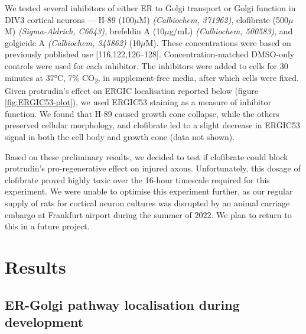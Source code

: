 \documentclass[
  12pt,
  a4paper,
]{book}
\begin{document}
We tested several inhibitors of either ER to Golgi transport or Golgi function in DIV3 cortical neurons --- H-89 (100\(\mu\)M) \emph{(Calbiochem, 371962)}, clofibrate (500\(\mu\)M) \emph{(Sigma-Aldrich, C6643)}, brefeldin A (10\(\mu\)g/mL) \emph{(Calbiochem, 500583)}, and golgicide A \emph{(Calbiochem, 345862)} (10\(\mu\)M). These concentrations were based on previously published use {[}116,122,126--128{]}. Concentration-matched DMSO-only controls were used for each inhibitor. The inhibitors were added to cells for 30 minutes at 37°C, 7\% CO\textsubscript{2}, in supplement-free media, after which cells were fixed. Given protrudin's effect on ERGIC localisation reported below (figure \ref{fig:ERGIC53-plot}), we used ERGIC53 staining as a measure of inhibitor function. We found that H-89 caused growth cone collapse, while the others preserved cellular morphology, and clofibrate led to a slight decrease in ERGIC53 signal in both the cell body and growth cone (data not shown).

Based on these preliminary results, we decided to test if clofibrate could block protrudin's pro-regenerative effect on injured axons. Unfortunately, this dosage of clofibrate proved highly toxic over the 16-hour timescale required for this experiment. We were unable to optimise this experiment further, as our regular supply of rats for cortical neuron cultures was disrupted by an animal carriage embargo at Frankfurt airport during the summer of 2022. We plan to return to this in a future project.

\hypertarget{results-2}{%
\section{Results}\label{results-2}}

\hypertarget{er-golgi-pathway-localisation-during-development}{%
\subsection{ER-Golgi pathway localisation during development}\label{er-golgi-pathway-localisation-during-development}}
\end{document}
